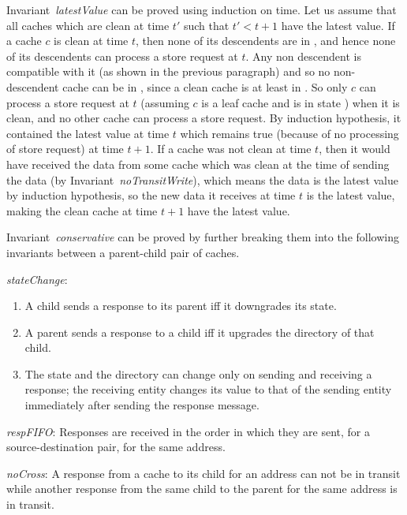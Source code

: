 Invariant~\textit{latestValue} can be proved using induction on time. Let us
assume that all caches which are clean at time $t'$ such that $t'<t+1$ have the
latest value. If a cache $c$ is clean at time $t$, then none of its descendents
are in \Mo, and hence none of its descendents can process a store request at
$t$. Any non descendent is compatible with it (as shown in the previous
paragraph) and so no non-descendent cache can be in \Mo, since a clean cache is
at least in \Sh. So only $c$ can process a store request at $t$ (assuming $c$
is a leaf cache and is in state \Mo) when it is clean, and no other cache can
process a store request. By induction hypothesis, it contained the latest value
at time $t$ which remains true (because of no processing of store request) at
time $t+1$. If a cache was not clean at time $t$, then it would have
received the data from some cache which was clean at the time of sending the
data (by Invariant~\textit{noTransitWrite}), which means the data is the latest
value by induction hypothesis, so the new data it receives at time $t$ is the
latest value, making the clean cache at time $t+1$ have the latest value.

Invariant~\textit{conservative} can be proved by
further breaking them into the following invariants between a parent-child pair
of caches.

\begin{inv}
\textit{stateChange}:
\begin{enumerate}
\item A child sends a response to its parent iff it downgrades its state.
\item A parent sends a response to a child iff it upgrades the directory of
that child.
\item The state and the directory can change only on sending and receiving a
response; the receiving entity changes its value to that of the sending entity
immediately after sending the response message.
\end{enumerate}
\label{stateChange}
\end{inv}

\begin{inv}
\textit{respFIFO}: Responses are received in the order in which they are sent,
for a source-destination pair, for the same address.
\label{respFIFO}
\end{inv}

\begin{inv}
\textit{noCross}: A response from a cache to its child for an address can not
be in transit while another response from the same child to the parent for the
same address is in transit.
\label{noCross}
\end{inv}

